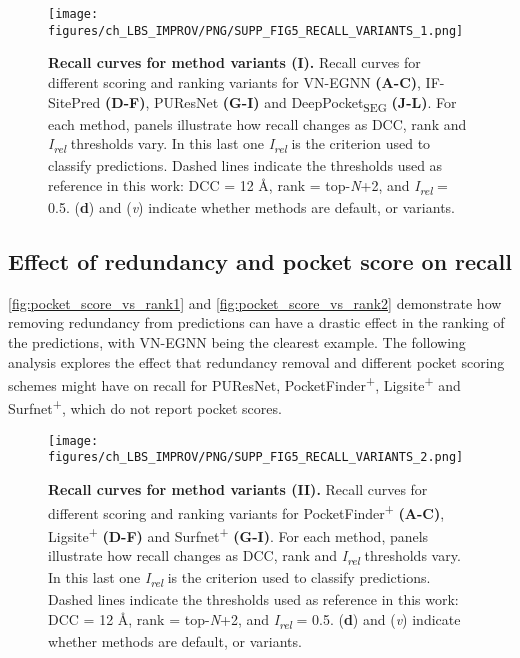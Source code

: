 \begin{figure}[ht!]
    \centering
    \texttt{[image: figures/ch\_LBS\_IMPROV/PNG/SUPP\_FIG5\_RECALL\_VARIANTS\_1.png]}
    \caption[Recall curves for method variants (I)]{\textbf{Recall curves for method variants (I).} Recall curves for different scoring and ranking variants for VN-EGNN \textbf{(A-C)}, IF-SitePred \textbf{(D-F)}, PUResNet \textbf{(G-I)} and DeepPocket\textsubscript{SEG} \textbf{(J-L)}. For each method, panels illustrate how recall changes as DCC, rank and \textit{I\textsubscript{rel}} thresholds vary. In this last one \textit{I\textsubscript{rel}} is the criterion used to classify predictions. Dashed lines indicate the thresholds used as reference in this work: DCC = 12 \AA{}, rank = top-\textit{N}+2, and \textit{I\textsubscript{rel}} = 0.5. (\textbf{d}) and (\textit{v}) indicate whether methods are default, or variants.}
    \label{fig:pocker_recall_variants1}
\end{figure}

\FloatBarrier

\subsection{Effect of redundancy and pocket score on recall}

\autoref{fig:pocket_score_vs_rank1} and \autoref{fig:pocket_score_vs_rank2} demonstrate how removing redundancy from predictions can have a drastic effect in the ranking of the predictions, with VN-EGNN being the clearest example. The following analysis explores the effect that redundancy removal and different pocket scoring schemes might have on recall for PUResNet, PocketFinder\textsuperscript{+}, Ligsite\textsuperscript{+} and Surfnet\textsuperscript{+}, which do not report pocket scores.

\begin{figure}[ht!]
    \centering
    \texttt{[image: figures/ch\_LBS\_IMPROV/PNG/SUPP\_FIG5\_RECALL\_VARIANTS\_2.png]}
    \caption[Recall curves for method variants (II)]{\textbf{Recall curves for method variants (II).} Recall curves for different scoring and ranking variants for PocketFinder\textsuperscript{+} \textbf{(A-C)}, Ligsite\textsuperscript{+} \textbf{(D-F)} and Surfnet\textsuperscript{+} \textbf{(G-I)}. For each method, panels illustrate how recall changes as DCC, rank and \textit{I\textsubscript{rel}} thresholds vary. In this last one \textit{I\textsubscript{rel}} is the criterion used to classify predictions. Dashed lines indicate the thresholds used as reference in this work: DCC = 12 \AA{}, rank = top-\textit{N}+2, and \textit{I\textsubscript{rel}} = 0.5. (\textbf{d}) and (\textit{v}) indicate whether methods are default, or variants.}
    \label{fig:pocker_recall_variants2}
\end{figure}

